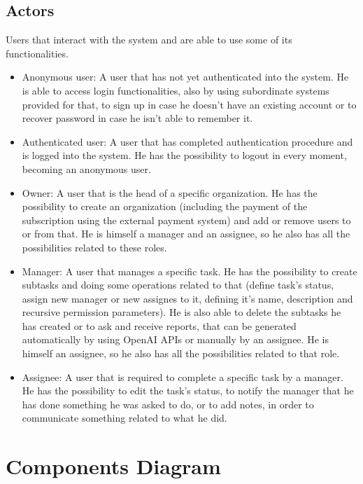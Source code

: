 \documentclass{article}
\begin{document}
\subsection{Actors}
Users that interact with the system and are able to use some of its functionalities.
\begin{itemize}
    \item Anonymous user: A user that has not yet authenticated into the system. He is able to access login functionalities, also by using subordinate systems provided for that, to sign up in case he doesn't have an existing account or to recover password in case he isn't able to remember it.
    \item Authenticated user: A user that has completed authentication procedure and is logged into the system. He has the possibility to logout in every moment, becoming an anonymous user.
    \item Owner: A user that is the head of a specific organization. He has the possibility to create an organization (including the payment of the subscription using the external payment system) and add or remove users to or from that. He is himself a manager and an assignee, so he also has all the possibilities related to these roles.
    \item Manager: A user that manages a specific task. He has the possibility to create subtasks and doing some operations related to that (define task's status, assign new manager or new assignes to it, defining it's name, description and recursive permission parameters). He is also able to delete the subtasks he has created or to ask and receive reports, that can be generated automatically by using OpenAI APIs or manually by an assignee. He is himself an assignee, so he also has all the possibilities related to that role.
    \item Assignee: A user that is required to complete a specific task by a manager. He has the possibility to edit the task's status, to notify the manager that he has done something he was asked to do, or to add notes, in order to communicate something related to what he did.
\end{itemize}

\section{Components Diagram}
\end{document}
